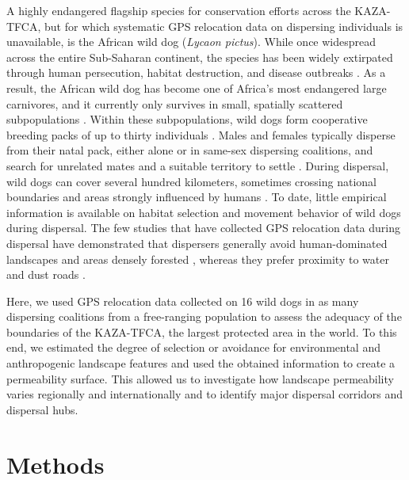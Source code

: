 \documentclass[abstract=on,10pt,a4paper,bibliography=totocnumbered]{article}
\begin{document}
A highly endangered flagship species for conservation efforts across the
KAZA-TFCA, but for which systematic GPS relocation data on dispersing
individuals is unavailable, is the African wild dog (\textit{Lycaon pictus}).
While once widespread across the entire Sub-Saharan continent, the species has
been widely extirpated through human persecution, habitat destruction, and
disease outbreaks \citep{Woodroffe.2012}. As a result, the African wild dog has
become one of Africa's most endangered large carnivores, and it currently only
survives in small, spatially scattered subpopulations \citep{Woodroffe.2012}.
Within these subpopulations, wild dogs form cooperative breeding packs of up to
thirty individuals \citep{Frame.1979, Fuller.1992, Creel.2002}. Males and
females typically disperse from their natal pack, either alone or in same-sex
dispersing coalitions, and search for unrelated mates and a suitable territory
to settle \citep{McNutt.1996, Behr.2020}. During dispersal, wild dogs can cover
several hundred kilometers, sometimes crossing national boundaries and areas
strongly influenced by humans \citep{DaviesMostert.2012, Masenga.2016,
Cozzi.2020}. To date, little empirical information is available on habitat
selection and movement behavior of wild dogs during dispersal. The few studies
that have collected GPS relocation data during dispersal have demonstrated that
dispersers generally avoid human-dominated landscapes \citep{Masenga.2016,
Oneill.2020, Cozzi.2020} and areas densely forested \citep{Oneill.2020},
whereas they prefer proximity to water and dust roads \citep{Oneill.2020}.

Here, we used GPS relocation data collected on 16 wild dogs in as many
dispersing coalitions from a free-ranging population to assess the adequacy of
the boundaries of the KAZA-TFCA, the largest protected area in the world. To
this end, we estimated the degree of selection or avoidance for environmental
and anthropogenic landscape features and used the obtained information to create
a permeability surface.  This allowed us to investigate how landscape
permeability varies regionally and internationally and to identify major
dispersal corridors and dispersal hubs.

\section{Methods}
\end{document}
